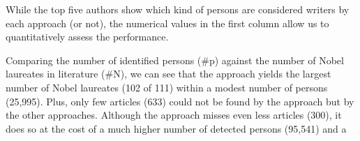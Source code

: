 \documentclass[a4paper,12pt]{scrartcl}
\begin{document}
%
%
While the top five authors show which kind of persons are
considered writers by each approach (or not), the numerical values
in the first column allow us to quantitatively assess the
performance. 
%
%
% 
\begin{comment}
| approach | persons |  only | onlyper | missing | missingper | onlymissingf1m | nobel | precision | recall |  f1m |
|----------+---------+-------+---------+---------+------------+----------------+-------+-----------+--------+------|
| tem wri  |   25995 |  5504 |   21.17 |     633 |       2.44 |           4.38 |   102 |      0.39 |  91.89 | 0.78 |
| cat wfl  |   95541 | 62310 |   65.22 |     300 |       0.31 |           0.62 |    94 |      0.10 |  84.68 | 0.20 |
| cat wbc  |   28245 | 10898 |   38.58 |    5272 |      18.67 |          25.16 |    57 |      0.20 |  51.35 | 0.40 |
| prop oc  |   18534 |  3589 |   19.36 |    2061 |      11.12 |          14.13 |    76 |      0.41 |  68.47 | 0.82 |
#+TBLFM: $4=($-1/$-2)*100;%
\end{comment}
%
%
%
Comparing the number of identified persons (\#p) against the number of
Nobel laureates in literature (\#N), we can see that the
\apInfoboxesEn approach yields the largest number of Nobel
laureates (102 of 111) within a modest number of persons (25,995).
%
Plus, only few articles (633) could not be found by the
\apInfoboxesEn approach but by the other approaches. Although the
\apCategoryGraph approach misses even less articles (300), it does so at
the cost of a much higher number of detected persons (95,541) and a
\end{document}

